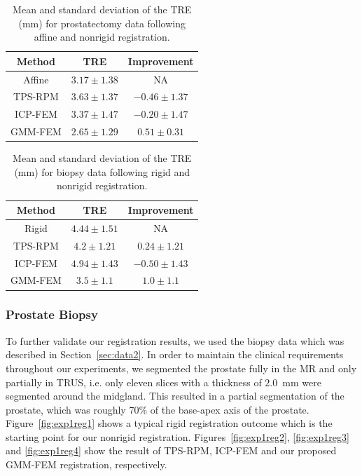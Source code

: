 \documentclass[journal]{IEEEtran}
\begin{document}
\begin{table}[tb]
\begin{center}
\caption{Mean and standard deviation of the TRE (mm) for prostatectomy data following affine and nonrigid registration.}
\centering
\begin{tabular}{c| c| c}
	\hline
	Method & TRE & Improvement\\
	\hline
	Affine & $3.17 \pm 1.38$ & NA \\
	\hline
	TPS-RPM & $3.63 \pm 1.37$ & $-0.46 \pm 1.37$ \\
	\hline
	ICP-FEM & $3.37 \pm 1.47$ & $-0.20 \pm 1.47$ \\
	\hline
	GMM-FEM & $2.65 \pm 1.29$ & $0.51 \pm 0.31$ \\
   \hline
\end{tabular}
\label{tab:exp2Res1}
\end{center}
\end{table}
\begin{table}[tb]
\begin{center}
\caption{Mean and standard deviation of the TRE (mm) for biopsy data following rigid and nonrigid registration.}
\centering
\begin{tabular}{c| c| c}
	\hline
	Method & TRE & Improvement\\
	\hline
	Rigid & $4.44 \pm 1.51$ & NA \\
	\hline
	TPS-RPM & $4.2 \pm 1.21$ & $0.24 \pm 1.21$ \\
	\hline
	ICP-FEM & $4.94 \pm 1.43$ & $-0.50 \pm 1.43$ \\
	\hline
	GMM-FEM & $3.5 \pm 1.1$ & $1.0 \pm 1.1$ \\
   \hline
\end{tabular}
\label{tab:exp1Res1}
\end{center}
\end{table}%
\subsubsection{Prostate Biopsy}
To further validate our registration results, we used the biopsy data which was described in Section~\ref{sec:data2}. In order to maintain the clinical requirements throughout our experiments, we segmented the prostate fully in the MR and only partially in TRUS, i.e. only eleven slices with a thickness of $2.0$~mm were segmented around the midgland. This resulted in a partial segmentation of the prostate, which was roughly 70\% of the base-apex axis of the prostate. Figure~\ref{fig:exp1reg1} shows a typical rigid registration outcome which is the starting point for our nonrigid registration. Figures~\ref{fig:exp1reg2}, \ref{fig:exp1reg3} and \ref{fig:exp1reg4} show the result of TPS-RPM, ICP-FEM and our proposed GMM-FEM registration, respectively.
\end{document}
